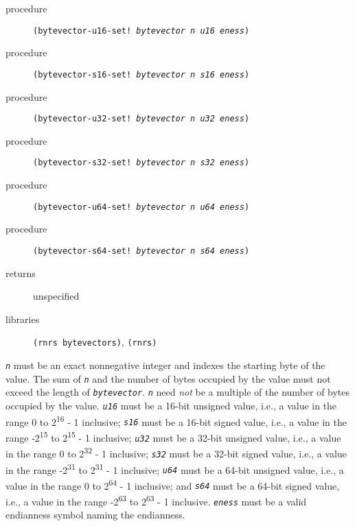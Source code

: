 \begin{description}

\label{objects_s257}\item[procedure] \texttt{(bytevector-u16-set! \textit{bytevector} \textit{n} \textit{u16} \textit{eness})}



\item[procedure] \texttt{(bytevector-s16-set! \textit{bytevector} \textit{n} \textit{s16} \textit{eness})}



\item[procedure] \texttt{(bytevector-u32-set! \textit{bytevector} \textit{n} \textit{u32} \textit{eness})}



\item[procedure] \texttt{(bytevector-s32-set! \textit{bytevector} \textit{n} \textit{s32} \textit{eness})}



\item[procedure] \texttt{(bytevector-u64-set! \textit{bytevector} \textit{n} \textit{u64} \textit{eness})}



\item[procedure] \texttt{(bytevector-s64-set! \textit{bytevector} \textit{n} \textit{s64} \textit{eness})}



\item[returns] unspecified


\item[libraries] \texttt{(rnrs bytevectors)}, \texttt{(rnrs)}
\end{description}

\texttt{\textit{n}} must be an exact nonnegative integer and
indexes the starting byte of the value.
The sum of \texttt{\textit{n}} and the number of bytes occupied by the value must
not exceed the length of \texttt{\textit{bytevector}}.
\texttt{\textit{n}} need \textit{not} be a multiple of the
number of bytes occupied by the value.
\texttt{\textit{u16}} must be a 16-bit unsigned value, i.e., a value in the range
0 to 2\textsuperscript{16} - 1 inclusive;
\texttt{\textit{s16}} must be a 16-bit signed value, i.e., a value in the range
-2\textsuperscript{15} to 2\textsuperscript{15} - 1 inclusive;
\texttt{\textit{u32}} must be a 32-bit unsigned value, i.e., a value in the range
0 to 2\textsuperscript{32} - 1 inclusive;
\texttt{\textit{s32}} must be a 32-bit signed value, i.e., a value in the range
-2\textsuperscript{31} to 2\textsuperscript{31} - 1 inclusive;
\texttt{\textit{u64}} must be a 64-bit unsigned value, i.e., a value in the range
0 to 2\textsuperscript{64} - 1 inclusive; and
\texttt{\textit{s64}} must be a 64-bit signed value, i.e., a value in the range
-2\textsuperscript{63} to 2\textsuperscript{63} - 1 inclusive.
\texttt{\textit{eness}} must be a valid endianness symbol naming the endianness.

